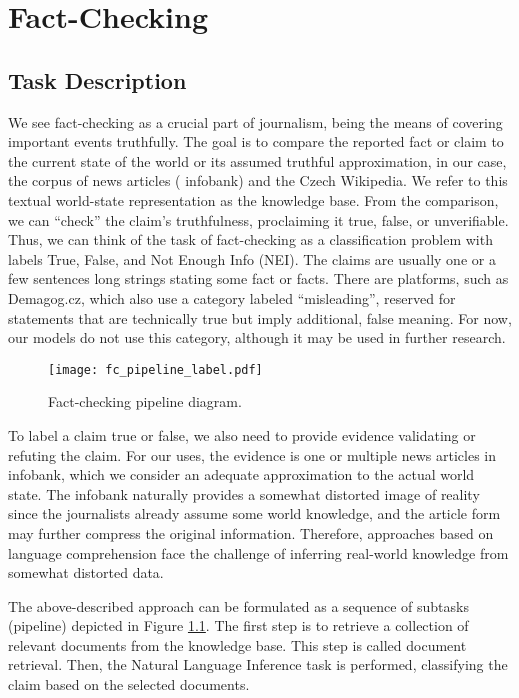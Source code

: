 \chapter{Fact-Checking}

\section{Task Description}

We see fact-checking as a crucial part of journalism, being the means of covering important events truthfully. 
The goal is to compare the reported fact or claim to the current state of the world or its assumed truthful approximation, in our case, the corpus of \CTK{} news articles (\CTK{} infobank) and the Czech Wikipedia.
We refer to this textual world-state representation as the knowledge base.
From the comparison, we can ``check'' the claim's truthfulness, proclaiming it true, false, or unverifiable. 
Thus, we can think of the task of fact-checking as a classification problem with labels True, False, and Not Enough Info (NEI). 
The claims are usually one or a few sentences long strings stating some fact or facts. 
There are platforms, such as Demagog.cz, which also use a category labeled ``misleading'', reserved for statements that are technically true but imply additional, false meaning.
For now, our models do not use this category, although it may be used in further research.

\begin{figure}[h!]
    \centering
    \texttt{[image: fc\_pipeline\_label.pdf]}
    \caption[Fact-Checking Pipeline]{Fact-checking pipeline diagram.}
    \label{fig:pipeline}
\end{figure}

To label a claim true or false, we also need to provide evidence validating or refuting the claim.
For our uses, the evidence is one or multiple news articles in \CTK{} infobank, which we consider an adequate approximation to the actual world state.
The infobank naturally provides a somewhat distorted image of reality since the journalists already assume some world knowledge, and the article form may further compress the original information.
Therefore, approaches based on language comprehension face the challenge of inferring real-world knowledge from somewhat distorted data. 

The above-described approach can be formulated as a sequence of subtasks (pipeline) depicted in Figure \ref{fig:pipeline}. The first step is to retrieve a collection of relevant documents from the knowledge base. This step is called document retrieval. Then, the Natural Language Inference task is performed, classifying the claim based on the selected documents.

